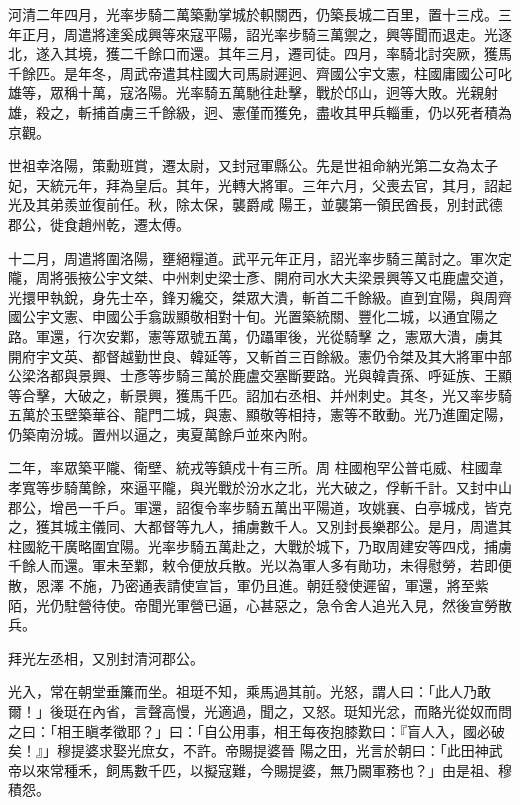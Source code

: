 \begin{pinyinscope}
 河清二年四月，光率步騎二萬築勳掌城於軹關西，仍築長城二百里，置十三戍。三年正月，周遣將達奚成興等來寇平陽，詔光率步騎三萬禦之，興等聞而退走。光逐北，遂入其境，獲二千餘口而還。其年三月，遷司徒。四月，率騎北討突厥，獲馬
 千餘匹。是年冬，周武帝遣其柱國大司馬尉遲迥、齊國公宇文憲，柱國庸國公可叱雄等，眾稱十萬，寇洛陽。光率騎五萬馳往赴擊，戰於邙山，迥等大敗。光親射雄，殺之，斬捕首虜三千餘級，迥、憲僅而獲免，盡收其甲兵輜重，仍以死者積為京觀。



 世祖幸洛陽，策勳班賞，遷太尉，又封冠軍縣公。先是世祖命納光第二女為太子妃，天統元年，拜為皇后。其年，光轉大將軍。三年六月，父喪去官，其月，詔起光及其弟羨並復前任。秋，除太保，襲爵咸
 陽王，並襲第一領民酋長，別封武德郡公，徙食趙州乾，遷太傅。



 十二月，周遣將圍洛陽，壅絕糧道。武平元年正月，詔光率步騎三萬討之。軍次定隴，周將張掖公宇文桀、中州刺史梁士彥、開府司水大夫梁景興等又屯鹿盧交道，光擐甲執銳，身先士卒，鋒刃纔交，桀眾大潰，斬首二千餘級。直到宜陽，與周齊國公宇文憲、申國公手翕跋顯敬相對十旬。光置築統關、豐化二城，以通宜陽之路。軍還，行次安鄴，憲等眾號五萬，仍躡軍後，光從騎擊
 之，憲眾大潰，虜其開府宇文英、都督越勤世良、韓延等，又斬首三百餘級。憲仍令桀及其大將軍中部公梁洛都與景興、士彥等步騎三萬於鹿盧交塞斷要路。光與韓貴孫、呼延族、王顯等合擊，大破之，斬景興，獲馬千匹。詔加右丞相、并州刺史。其冬，光又率步騎五萬於玉壁築華谷、龍門二城，與憲、顯敬等相持，憲等不敢動。光乃進圍定陽，仍築南汾城。置州以逼之，夷夏萬餘戶並來內附。



 二年，率眾築平隴、衛壁、統戎等鎮戍十有三所。周
 柱國枹罕公普屯威、柱國韋孝寬等步騎萬餘，來逼平隴，與光戰於汾水之北，光大破之，俘斬千計。又封中山郡公，增邑一千戶。軍還，詔復令率步騎五萬出平陽道，攻姚襄、白亭城戍，皆克之，獲其城主儀同、大都督等九人，捕虜數千人。又別封長樂郡公。是月，周遣其柱國紇干廣略圍宜陽。光率步騎五萬赴之，大戰於城下，乃取周建安等四戍，捕虜千餘人而還。軍未至鄴，敕令便放兵散。光以為軍人多有勛功，未得慰勞，若即便散，恩澤
 不施，乃密通表請使宣旨，軍仍且進。朝廷發使遲留，軍還，將至紫陌，光仍駐營待使。帝聞光軍營已逼，心甚惡之，急令舍人追光入見，然後宣勞散兵。



 拜光左丞相，又別封清河郡公。



 光入，常在朝堂垂簾而坐。祖珽不知，乘馬過其前。光怒，謂人曰：「此人乃敢爾！」後珽在內省，言聲高慢，光適過，聞之，又怒。珽知光忿，而賂光從奴而問之曰：「相王瞋孝徵耶？」曰：「自公用事，相王每夜抱膝歎曰：『盲人入，國必破矣！』」穆提婆求娶光庶女，不許。帝賜提婆晉
 陽之田，光言於朝曰：「此田神武帝以來常種禾，飼馬數千匹，以擬寇難，今賜提婆，無乃闕軍務也？」由是祖、穆積怨。




\end{pinyinscope}

